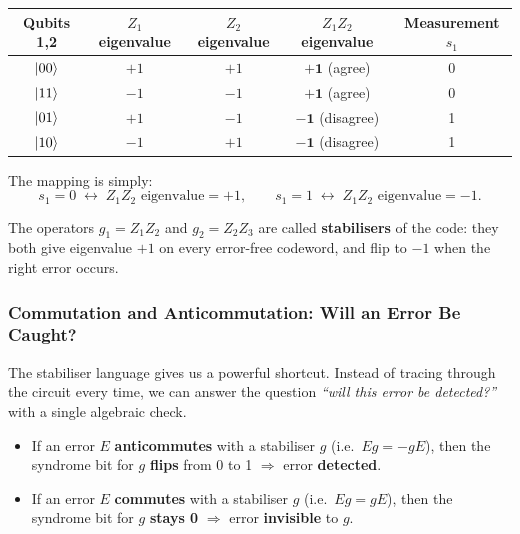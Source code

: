 \documentclass[11pt, a4paper]{article}
\theoremstyle{definition}
\theoremstyle{plain}
\theoremstyle{remark}
\begin{document}
\begin{center}
\renewcommand{\arraystretch}{1.3}
\begin{tabular}{@{} c c c c c @{}}
  \toprule
  \textbf{Qubits 1,2} & $Z_1$ eigenvalue & $Z_2$ eigenvalue
    & $Z_1Z_2$ eigenvalue & Measurement $s_1$\\
  \midrule
  $\ket{00}$ & $+1$ & $+1$ & $\mathbf{+1}$ (agree)    & 0\\
  $\ket{11}$ & $-1$ & $-1$ & $\mathbf{+1}$ (agree)    & 0\\
  $\ket{01}$ & $+1$ & $-1$ & $\mathbf{-1}$ (disagree) & 1\\
  $\ket{10}$ & $-1$ & $+1$ & $\mathbf{-1}$ (disagree) & 1\\
  \bottomrule
\end{tabular}
\end{center}

The mapping is simply:
\[
  s_1 = 0 \;\longleftrightarrow\; Z_1Z_2 \text{ eigenvalue} = +1,
  \qquad
  s_1 = 1 \;\longleftrightarrow\; Z_1Z_2 \text{ eigenvalue} = -1.
\]

The operators $g_1 = Z_1Z_2$ and $g_2 = Z_2Z_3$ are called
\textbf{stabilisers} of the code: they both give eigenvalue $+1$ on
every error-free codeword, and flip to $-1$ when the right error occurs.

\subsubsection{Commutation and Anticommutation: Will an Error Be Caught?}

The stabiliser language gives us a powerful shortcut.
Instead of tracing through the circuit every time, we can answer the
question \emph{``will this error be detected?''} with a single algebraic
check.

\begin{keypoint}
\begin{itemize}
  \item If an error $E$ \textbf{anticommutes} with a stabiliser $g$
        (i.e.\ $Eg = -gE$), then the syndrome bit for $g$
        \textbf{flips} from 0 to 1 $\Rightarrow$ error \textbf{detected}.
  \item If an error $E$ \textbf{commutes} with a stabiliser $g$
        (i.e.\ $Eg = gE$), then the syndrome bit for $g$
        \textbf{stays 0} $\Rightarrow$ error \textbf{invisible} to $g$.
\end{itemize}
\end{keypoint}
\end{document}
